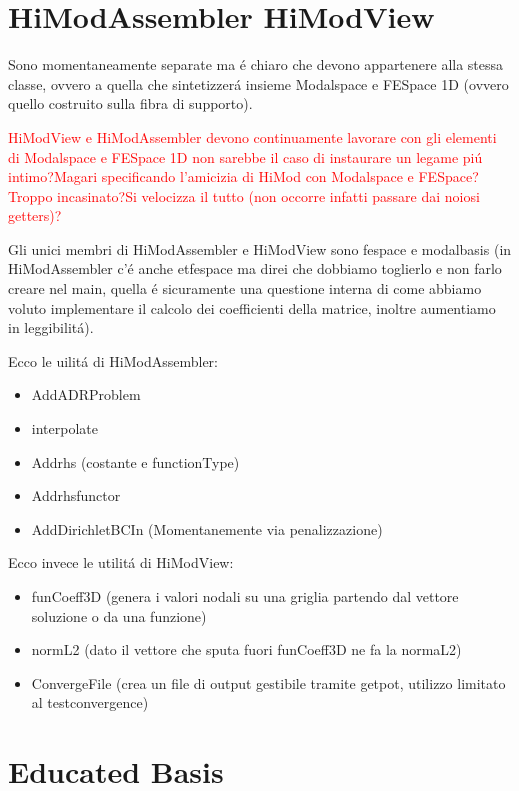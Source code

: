 \section{HiModAssembler  HiModView}
 
 Sono momentaneamente separate ma \'e chiaro che devono appartenere alla stessa classe, ovvero a quella che sintetizzer\'a insieme Modalspace e FESpace 1D (ovvero quello costruito sulla fibra di supporto).
 
 \textcolor{red}{HiModView e HiModAssembler devono continuamente lavorare con gli elementi di Modalspace e FESpace 1D non sarebbe il caso di instaurare un legame pi\'u intimo?Magari specificando l'amicizia di HiMod con Modalspace e FESpace?Troppo incasinato?Si velocizza il tutto (non occorre infatti passare dai noiosi getters)?}
 
Gli unici membri di HiModAssembler e HiModView sono fespace e modalbasis (in HiModAssembler c'\'e anche etfespace ma direi che dobbiamo toglierlo e non farlo creare nel main, quella \'e sicuramente una questione interna di come abbiamo voluto implementare il calcolo dei coefficienti della matrice, inoltre aumentiamo in leggibilit\'a).

Ecco le uilit\'a di HiModAssembler:
\begin{itemize}
\item AddADRProblem
\item interpolate
\item Addrhs (costante e functionType)
\item Addrhsfunctor
\item AddDirichletBCIn (Momentanemente via penalizzazione)
\end{itemize}

Ecco invece le utilit\'a di HiModView:
\begin{itemize}
\item funCoeff3D (genera i valori nodali su una griglia partendo dal vettore soluzione o da una funzione)
\item normL2 (dato il vettore che sputa fuori funCoeff3D ne fa la normaL2)
\item ConvergeFile (crea un file di output gestibile tramite getpot, utilizzo limitato al testconvergence)
\end{itemize}


\section{Educated Basis}

